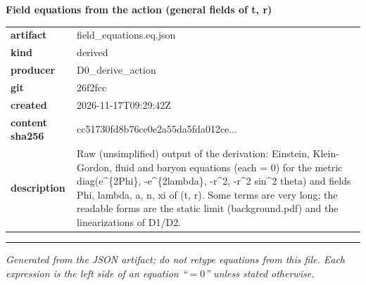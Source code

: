 \documentclass[10pt,a4paper]{article}
\begin{document}
{\Large\bfseries Field equations from the action (general fields of t, r)}\par
\smallskip
\begin{tabular}{@{}lp{}@{}}\textbf{artifact} & field\_equations.eq.json\\\textbf{kind} & derived\\\textbf{producer} & D0\_derive\_action\\\textbf{git} & 26f2fcc\\\textbf{created} & 2026-11-17T09:29:42Z\\\textbf{content sha256} & cc51730fd8b76ce0e2a55da5fda012ce...\\\textbf{description} & Raw (unsimplified) output of the derivation: Einstein, Klein-Gordon, fluid and baryon equations (each = 0) for the metric diag(e\textasciicircum{}\{2Phi\}, -e\textasciicircum{}\{2lambda\}, -r\textasciicircum{}2, -r\textasciicircum{}2 sin\textasciicircum{}2 theta) and fields Phi, lambda, a, n, xi of (t, r). Some terms are very long; the readable forms are the static limit (background.pdf) and the linearizations of D1/D2.\\\end{tabular}
\par\medskip\hrule\medskip

\textit{Generated from the JSON artifact; do not retype equations from this file. Each expression is the left side of an equation ``$= 0$'' unless stated otherwise.}\par
\end{document}
